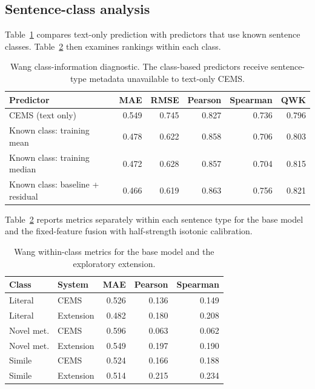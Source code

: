 \subsection{Sentence-class analysis}

Table~\ref{tab:class_prior} compares text-only prediction with predictors that use known sentence classes. Table~\ref{tab:within_class} then examines rankings within each class.

\begin{table}[t]
\centering
\footnotesize
\setlength{\tabcolsep}{5pt}
\caption{Wang class-information diagnostic. The class-based predictors receive sentence-type metadata unavailable to text-only CEMS.}
\label{tab:class_prior}
\begin{tabular}{lrrrrr}
\toprule
Predictor & MAE & RMSE & Pearson & Spearman & QWK\\
\midrule
CEMS (text only) & 0.549 & 0.745 & 0.827 & 0.736 & 0.796\\
Known class: training mean & 0.478 & 0.622 & 0.858 & 0.706 & 0.803\\
Known class: training median & 0.472 & 0.628 & 0.857 & 0.704 & 0.815\\
Known class: baseline + residual & 0.466 & 0.619 & 0.863 & 0.756 & 0.821\\
\bottomrule
\end{tabular}
\end{table}


Table~\ref{tab:within_class} reports metrics separately within each sentence type for the base model and the fixed-feature fusion with half-strength isotonic calibration.

\begin{table}[t]
\centering
\footnotesize
\setlength{\tabcolsep}{3pt}
\caption{Wang within-class metrics for the base model and the exploratory extension.}
\label{tab:within_class}
\begin{tabular}{llrrr}
\toprule
Class & System & MAE & Pearson & Spearman\\
\midrule
Literal & CEMS & 0.526 & 0.136 & 0.149\\
Literal & Extension & 0.482 & 0.180 & 0.208\\
Novel met. & CEMS & 0.596 & 0.063 & 0.062\\
Novel met. & Extension & 0.549 & 0.197 & 0.190\\
Simile & CEMS & 0.524 & 0.166 & 0.188\\
Simile & Extension & 0.514 & 0.215 & 0.234\\
\bottomrule
\end{tabular}
\end{table}
